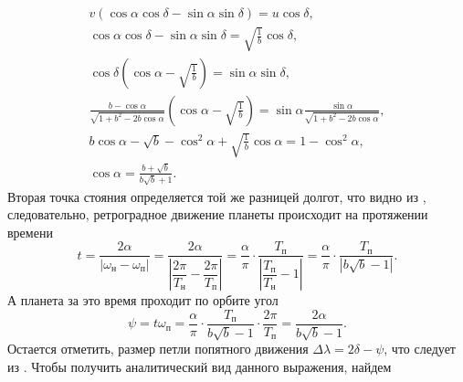 \begin{gather}
    v (\cos \alpha \cos \delta - \sin \alpha \sin \delta) = u \cos \delta,\nonumber\\
    \cos \alpha \cos \delta - \sin \alpha \sin \delta = \sqrt{\frac{1}{b}} \cos \delta,\nonumber\\
    \cos \delta \left( \cos \alpha - \sqrt{\frac{1}{b}} \right) = \sin \alpha \sin \delta,\nonumber\\
    \frac{b - \cos \alpha}{\sqrt{1 + b^2 - 2 b \cos \alpha}}\left( \cos \alpha - \sqrt{\frac{1}{b}} \right) = \sin \alpha \frac{\sin \alpha}{\sqrt{1 + b^2 - 2 b \cos \alpha}},\nonumber\\
    b \cos \alpha - \sqrt{b} - \cos^2 \alpha + \sqrt{\frac{1}{b}} \cos \alpha = 1 - \cos^2 \alpha,\nonumber\\
    \cos \alpha = \frac{b + \sqrt{b}}{b \sqrt{b} + 1}.
    \label{eq:retrograde-movement-alpha}
\end{gather}
Вторая точка стояния определяется той же разницей долгот, что видно из , следовательно, ретроградное движение планеты происходит на протяжении времени
\begin{equation*}
    t 
        = \frac{2 \alpha}{|\omega_\text{н} - \omega_\text{п}|} 
        = \frac{2 \alpha}{\left|\dfrac{2\pi}{T_\text{н}} - \dfrac{2\pi}{T_\text{п}} \right|} 
        = \frac{\alpha}{\pi}\cdot \frac{T_\text{п}}{\left|\dfrac{T_\text{п}}{T_\text{н}} - 1\right|} 
        = \frac{\alpha}{\pi}\cdot \frac{T_\text{п}}{\left| b \sqrt{b} - 1 \right|}.
\end{equation*}
А планета за это время проходит по орбите угол
\begin{equation*}
    \psi = t \omega_\text{п} = \frac{\alpha}{\pi} \cdot \frac{T_\text{п}}{b \sqrt{b} - 1} \cdot \frac{2\pi}{T_\text{п}} = \frac{2\alpha}{b \sqrt{b} - 1}.
\end{equation*}
Остается отметить, размер петли попятного движения $\Delta \lambda = 2\delta - \psi$, что следует из . Чтобы получить аналитический вид данного выражения, найдем

